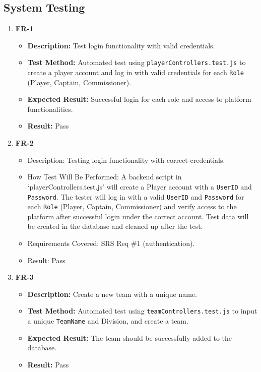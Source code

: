 \documentclass[12pt, titlepage]{article}
\begin{document}
\subsection{System Testing}
\begin{enumerate}
    \item \textbf{FR-1}
    \begin{itemize}
        \item \textbf{Description:} Test login functionality with valid credentials.
        \item \textbf{Test Method:} Automated test using \texttt{playerControllers.test.js} to create a player account and log in with valid credentials for each \texttt{Role} (Player, Captain, Commissioner).
        \item \textbf{Expected Result:} Successful login for each role and access to platform functionalities.
        \item \textbf{Result:} Pass
    \end{itemize}

    \item \textbf{FR-2}
        \begin{itemize}
            \item Description: Testing login functionality with correct credentials.
            \item How Test Will Be Performed: A backend script in `playerControllers.test.js' will create a Player account with a \texttt{UserID} and \texttt{Password}. The tester will log in with a valid \texttt{UserID} and \texttt{Password} for each \texttt{Role} (Player, Captain, Commissioner) and verify access to the platform after successful login under the correct account. Test data will be created in the database and cleaned up after the test.
            \item Requirements Covered: SRS Req \#1 (authentication).
            \item Result: Pass
        \end{itemize}

        \item \textbf{FR-3}
        \begin{itemize}
            \item \textbf{Description:} Create a new team with a unique name.
            \item \textbf{Test Method:} Automated test using \texttt{teamControllers.test.js} to input a unique \texttt{TeamName} and Division, and create a team.
            \item \textbf{Expected Result:} The team should be successfully added to the database.
            \item \textbf{Result:} Pass
        \end{itemize}


\end{enumerate}
\end{document}
